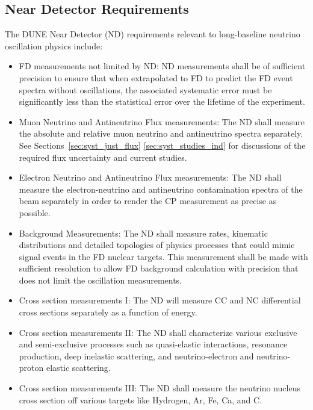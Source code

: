 \subsection{Near Detector Requirements}
\label{sec:physics-lbnosc-nd-req}

The DUNE Near Detector (ND) requirements relevant to long-baseline
neutrino oscillation physics include:
\begin{itemize}
\item FD measurements not limited by ND: ND measurements shall be of
  sufficient precision to ensure that when extrapolated to FD to
  predict the FD event spectra without oscillations, the associated
  systematic error must be significantly less than the statistical
  error over the lifetime of the experiment.
\item Muon Neutrino and Antineutrino Flux measurements: The ND shall
  measure the absolute and relative muon neutrino and antineutrino
  spectra separately.  See Sections~\ref{sec:syst_just_flux}
  \ref{sec:syst_studies_ind} for discussions of the required flux
  uncertainty and current studies.
 \item Electron Neutrino and Antineutrino Flux measurements: The ND shall measure the electron-neutrino and antineutrino contamination spectra of the beam separately in order to render the CP measurement as precise as possible.
 \item Background Measurements: The ND shall measure rates, kinematic
   distributions and detailed topologies of physics processes that
   could mimic signal events in the FD nuclear targets. This
   measurement shall be made with sufficient resolution to allow FD
   background calculation with precision that does not limit the
   oscillation measurements.
 \item Cross section measurements I: The ND will measure CC and NC
   differential cross sections separately as a function of energy.
 \item Cross section measurements II: The ND shall characterize
   various exclusive and semi-exclusive processes such as
   quasi-elastic interactions, resonance production, deep inelastic
   scattering, and neutrino-electron and neutrino-proton elastic
   scattering.
 \item Cross section measurements III: The ND shall measure the
   neutrino nucleus cross section off various targets like Hydrogen,
   Ar, Fe, Ca, and C.
\end{itemize}


